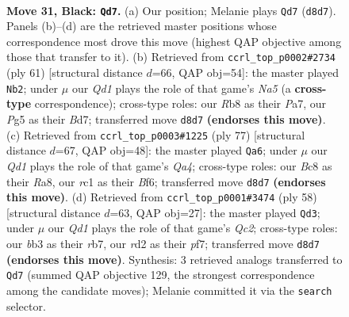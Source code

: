 \documentclass[11pt]{article}
\begin{document}
\clearpage

\begin{figure}[p]\centering
\begin{subfigure}{0.46\textwidth}\centering
\resizebox{\linewidth}{!}{%
\newchessgame
\chessboard[
  setfen={1rbq4/pp4k1/n5p1/2pP2pp/8/PB1Q1PP1/1P1R1K1P/2R5 b - - 2 31},
  showmover=false,
  pgfstyle=straightmove, color=movearrow, markmove={d8-d7}
]}
\caption{}
\end{subfigure}\hfill
\begin{subfigure}{0.46\textwidth}\centering
\resizebox{\linewidth}{!}{%
\newchessgame
\chessboard[
  setfen={4r1k1/p2b1pp1/2q4p/1p1p3P/n2P1Q2/2P2P2/P5P1/1BR1B1K1 b - - 4 31},
  showmover=false,
  pgfstyle=straightmove, color=movearrow, markmove={a4-b2}
]}
\caption{}
\end{subfigure}
\\[4pt]
\begin{subfigure}{0.46\textwidth}\centering
\resizebox{\linewidth}{!}{%
\newchessgame
\chessboard[
  setfen={r4k2/5pp1/2p1pb1p/q1Pn3P/Pp1P4/1Q4P1/2B2PK1/B2R4 b - - 13 39},
  showmover=false,
  pgfstyle=straightmove, color=movearrow, markmove={a5-a6}
]}
\caption{}
\end{subfigure}\hfill
\begin{subfigure}{0.46\textwidth}\centering
\resizebox{\linewidth}{!}{%
\newchessgame
\chessboard[
  setfen={2b1rk2/1rp2ppB/p4q1p/3pN2P/3P1P2/6P1/P1Q2P2/2R3K1 w - - 1 30},
  showmover=false,
  pgfstyle=straightmove, color=movearrow, markmove={c2-d3}
]}
\caption{}
\end{subfigure}
\caption{\textbf{Move 31, Black: \texttt{Qd7}.} (a) Our position; Melanie plays \texttt{Qd7} (\texttt{d8d7}). Panels (b)--(d) are the retrieved master positions whose correspondence most drove this move (highest QAP objective among those that transfer to it). (b) Retrieved from \texttt{ccrl\_top\_p0002\#2734} (ply 61) [structural distance $d$=66, QAP obj=54]: the master played \texttt{Nb2}; under $\mu$ our \emph{Qd1} plays the role of that game's \emph{Na5} (a \textbf{cross-type} correspondence); cross-type roles: our \emph{R}b8 as their \emph{P}a7, our \emph{P}g5 as their \emph{B}d7; transferred move \texttt{d8d7} \textbf{(endorses this move)}. (c) Retrieved from \texttt{ccrl\_top\_p0003\#1225} (ply 77) [structural distance $d$=67, QAP obj=48]: the master played \texttt{Qa6}; under $\mu$ our \emph{Qd1} plays the role of that game's \emph{Qa4}; cross-type roles: our \emph{B}c8 as their \emph{R}a8, our \emph{r}c1 as their \emph{B}f6; transferred move \texttt{d8d7} \textbf{(endorses this move)}. (d) Retrieved from \texttt{ccrl\_top\_p0001\#3474} (ply 58) [structural distance $d$=63, QAP obj=27]: the master played \texttt{Qd3}; under $\mu$ our \emph{Qd1} plays the role of that game's \emph{Qc2}; cross-type roles: our \emph{b}b3 as their \emph{r}b7, our \emph{r}d2 as their \emph{p}f7; transferred move \texttt{d8d7} \textbf{(endorses this move)}. Synthesis: 3 retrieved analogs transferred to \texttt{Qd7} (summed QAP objective 129, the strongest correspondence among the candidate moves); Melanie committed it via the \texttt{search} selector.}
\label{fig:thought-m61}
\end{figure}
\end{document}

